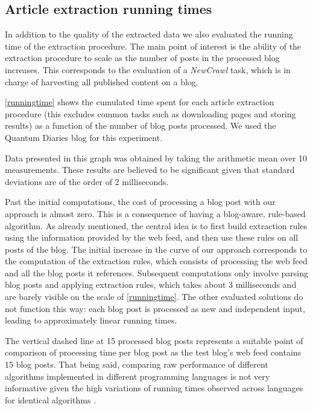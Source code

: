 \subsection{Article extraction running times}

In addition to the quality of the extracted data we also evaluated the running time of the extraction procedure. The main point of interest is the ability of the extraction procedure to scale as the number of posts in the processed blog increases. This corresponds to the evaluation of a \emph{NewCrawl} task, which is in charge of harvesting all published content on a blog.

\autoref{runningtime} shows the cumulated time spent for each article extraction procedure (this excludes common tasks such as downloading pages and storing results) as a function of the number of blog posts processed. We used the Quantum Diaries \cite{quantumdiaries} blog for this experiment.

Data presented in this graph was obtained by taking the arithmetic mean over 10 measurements. These results are believed to be significant given that standard deviations are of the order of 2 milliseconds.




Past the initial computations, the cost of processing a blog post with our approach is almost zero. This is a consequence of having a blog-aware, rule-based algorithm. As already mentioned, the central idea is to first build extraction rules using the information provided by the web feed, and then use these rules on all posts of the blog. The initial increase in the curve of our approach corresponds to the computation of the extraction rules, which consists of processing the web feed and all the blog posts it references. Subsequent computations only involve parsing blog posts and applying extraction rules, which takes about 3 milliseconds and are barely visible on the scale of \autoref{runningtime}. The other evaluated solutions do not function this way: each blog post is processed as new and independent input, leading to approximately linear running times.

The vertical dashed line at 15 processed blog posts represents a suitable point of comparison of processing time per blog post as the test blog's web feed contains 15 blog posts. That being said, comparing raw performance of different algorithms implemented in different programming languages is not very informative given the high variations of running times observed across languages for identical algorithms \cite{hundt2011}.

